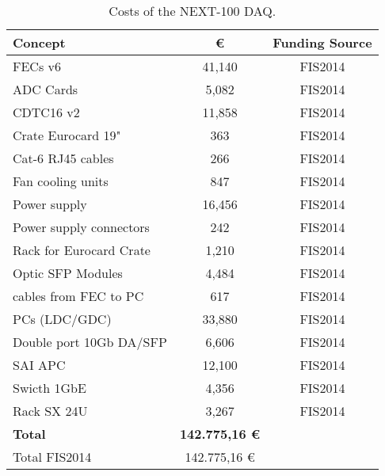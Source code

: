 \begin{table}[h!]
\begin{center}
\begin{tabular}{|l|c|c|}
\hline
 Concept & \euro & Funding Source \\
 \hline
FECs v6	&	41,140 & FIS2014 \\
ADC Cards	&	5,082 & FIS2014 \\
CDTC16 v2	&	11,858 & FIS2014 \\
Crate Eurocard 19" 	&	363 & FIS2014 \\
Cat-6 RJ45 cables & 266 & FIS2014 \\
Fan cooling units	&	847 & FIS2014 \\
Power supply & 	16,456 & FIS2014 \\
Power supply connectors &	242 & FIS2014 \\
Rack for Eurocard Crate	&	1,210 & FIS2014 \\
Optic SFP Modules &	4,484 & FIS2014 \\
cables from FEC to PC &	617 & FIS2014 \\
PCs (LDC/GDC)	&	33,880 & FIS2014 \\
Double port 10Gb DA/SFP & 6,606 & FIS2014 \\
SAI	APC	 &	12,100 & FIS2014 \\
Swicth 1GbE	& 4,356 & FIS2014 \\
Rack  SX 24U 	&	3,267 & FIS2014 \\						
  \hline
{\bf Total} &	{\bf 142.775,16 €}	& \\
 Total FIS2014	&	142.775,16 €	& \\
 \hline\hline
\end{tabular}  
\caption{Costs of the NEXT-100 DAQ.}
\label{tab.n100:DAQ}
\end{center}
\end{table} 



